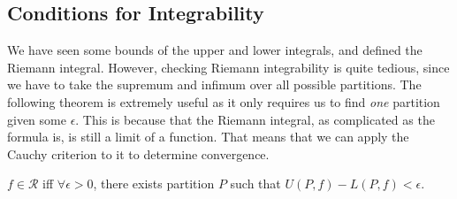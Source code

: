 \subsection{Conditions for Integrability}

  We have seen some bounds of the upper and lower integrals, and defined the Riemann integral. However, checking Riemann integrability is quite tedious, since we have to take the supremum and infimum over all possible partitions. The following theorem is extremely useful as it only requires us to find \textit{one} partition given some $\epsilon$. This is because that the Riemann integral, as complicated as the formula is, is still a limit of a function. That means that we can apply the Cauchy criterion to it to determine convergence. 

  \begin{theorem}
    \label{thm:cauchy-riemann-integrability}
    $f \in \mathcal{R}$ iff $\forall \epsilon > 0$, there exists partition $P$ such that $U(P, f) - L(P, f) < \epsilon$. 
  \end{theorem}
